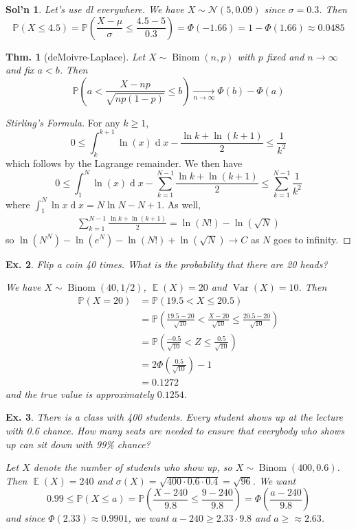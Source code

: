 \documentclass[12pt, a4paper]{book}
\DeclareMathOperator{\E}{\mathbb{E}}
\DeclareMathOperator{\Binom}{Binom}
\DeclareMathOperator{\Var}{Var}
\renewcommand{\Pr}{\mathbb{P}}
\renewcommand{\d}[1]{\ensuremath{\operatorname{d}\!{#1}}} %
\newtheorem{theorem}{Thm.}[section]
\newtheorem{example}[theorem]{Ex.}
\theoremstyle{nonumberplain}
\newtheorem{solution}{Sol'n}
\newtheorem{proof}{Proof}
\begin{document}
\begin{solution}
    Let's use dl everywhere.
    We have $X\sim\mathcal{N}(5,0.09)$ since $\sigma=0.3$.
    Then
    \[\Pr(X\leq 4.5)=\Pr\left(\frac{X-\mu}{\sigma}\leq\frac{4.5-5}{0.3}\right)=\Phi(-1.66)=1-\Phi(1.66)\approx 0.0485\]
\end{solution}
\begin{theorem}[deMoivre-Laplace]
    Let $X\sim\Binom(n,p)$ with $p$ fixed and $n\to\infty$ and fix $a<b$.
    Then
    \[\Pr\left(a<\frac{X-np}{\sqrt{np(1-p)}}\leq b\right)\underset{n\to\infty}{\longrightarrow}\Phi(b)-\Phi(a)\]
\end{theorem}
\begin{proof}[Stirling's Formula]
    For any $k\geq 1$,
    \[0\leq\int_k^{k+1}\ln(x)\d{x}-\frac{\ln k+\ln(k+1)}{2}\leq\frac{1}{k^2}\]
    which follows by the Lagrange remainder.
    We then have
    \[0\leq\int_1^N\ln(x)\d{x}-\sum\limits_{k=1}^{N-1}\frac{\ln k+\ln(k+1)}{2}\leq\sum\limits_{k=1}^{N-1}\frac{1}{k^2}\]
    where $\int_1^N\ln x\d{x}=N\ln N-N+1$.
    As well,
    \begin{align*}
        \sum\limits_{k=1}^{N-1}\frac{\ln k+\ln(k+1)}{2} = \ln(N!)-\ln(\sqrt{N})
    \end{align*}
    so $\ln(N^N)-\ln(e^N)-\ln(N!)+\ln(\sqrt{N})\to C$ as $N$ goes to infinity.
\end{proof}
\begin{example}
    Flip a coin 40 times.
    What is the probability that there are 20 heads?
    
    We have $X\sim\Binom(40,1/2)$, $\E(X)=20$ and $\Var(X)=10$.
    Then
    \begin{align*}
        \Pr(X=20) &= \Pr(19.5<X\leq 20.5)\\
                  &= \Pr\left(\frac{19.5-20}{\sqrt{10}}<\frac{X-20}{\sqrt{10}}\leq\frac{20.5-20}{\sqrt{10}}\right)\\
                  &= \Pr\left(\frac{-0.5}{\sqrt{10}}<Z\leq\frac{0.5}{\sqrt{10}}\right)\\
                  &= 2\Phi\left(\frac{0.5}{\sqrt{10}}\right)-1\\
                  &= 0.1272
    \end{align*}
    and the true value is approximately $0.1254$.
\end{example}
\begin{example}
    There is a class with 400 students.
    Every student shows up at the lecture with 0.6 chance.
    How many seats are needed to ensure that everybody who shows up can sit down with 99\% chance?

    Let $X$ denote the number of students who show up, so $X\sim\Binom(400,0.6)$.
    Then $\E(X)=240$ and $\sigma(X)=\sqrt{400\cdot 0.6\cdot 0.4}=\sqrt{96}$.
    We want
    \[0.99\leq\Pr(X\leq a)=\Pr\left(\frac{X-240}{9.8}\leq\frac{9-240}{9.8}\right)=\Phi\left(\frac{a-240}{9.8}\right)\]
    and since $\Phi(2.33)\approx 0.9901$, we want $a-240\geq2.33\cdot 9.8$ and $a\geq\approx 2.63$.
\end{example}
\end{document}
